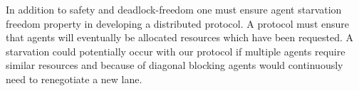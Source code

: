 










In addition to safety and deadlock-freedom one must ensure agent starvation freedom property in developing a distributed protocol. A protocol must ensure that agents will eventually be allocated resources which have been requested. A starvation could potentially occur with our protocol if multiple agents require similar resources and because of diagonal blocking agents would continuously need to renegotiate a new lane.




